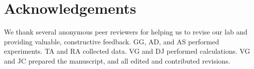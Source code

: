 ﻿\documentclass[reprint,amsmath,amssymb,aps,twoside]{revtex4-2}
\begin{document}
\section{Acknowledgements}
We thank several anonymous peer reviewers for helping us to revise our lab and providing valuable, constructive feedback.  GG, AD, and AS performed experiments. TA and RA collected data. VG and DJ performed calculations. VG and JC prepared the manuscript, and all edited and contributed revisions. 
\end{document}
